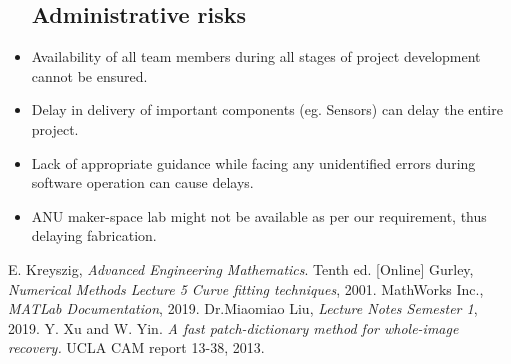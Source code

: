 \documentclass[a4paper]{article}
\begin{document}
\begin{itemize}
\subsection{Administrative risks}
    \item{Availability of all team members during all stages of project development cannot be ensured.}
    \item{Delay in delivery of important components (eg. Sensors) can delay the entire project.}
    \item{Lack of appropriate guidance while facing any unidentified errors during software operation can cause delays.}
    \item{ANU maker-space lab might not be available as per our requirement, thus delaying fabrication.}

\end{itemize}
\begin{thebibliography}{9}
  E. Kreyszig,
  \emph{Advanced Engineering Mathematics}.
   Tenth ed. [Online]
  Gurley,
  \emph{Numerical Methods Lecture 5 Curve fitting techniques},
   2001.
  MathWorks Inc.,
  \emph{MATLab Documentation},
   2019.
  Dr.Miaomiao Liu,
  \emph{Lecture Notes Semester 1},
   2019.
Y. Xu and W. Yin. \emph{A fast patch-dictionary method for whole-image recovery.} UCLA CAM report 13-38, 2013.
\end{thebibliography}
\end{document}
